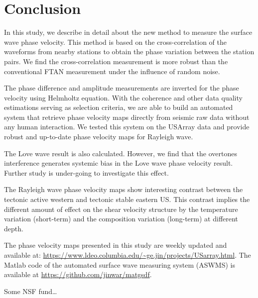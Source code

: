 \documentclass[referee]{gji}
\begin{document}
\section{Conclusion}

In this study, we describe in detail about the new method to measure the surface wave phase velocity. This method is based on the cross-correlation of the waveforms from nearby stations to obtain the phase variation between the station pairs. We find the cross-correlation measurement is more robust than the conventional FTAN measurement under the influence of random noise.

The phase difference and amplitude measurements are inverted for the phase velocity using Helmholtz equation. With the coherence and other data quality estimations serving as selection criteria, we are able to build an automated system that retrieve phase velocity maps directly from seismic raw data without any human interaction. We tested this system on the USArray data and provide robust and up-to-date phase velocity maps for Rayleigh wave.

The Love wave result is also calculated. However, we find that the overtones interference generates systemic bias in the Love wave phase velocity result. Further study is under-going to investigate this effect.

The Rayleigh wave phase velocity maps show interesting contrast between the tectonic active western and tectonic stable eastern US. This contrast implies the different amount of effect on the shear velocity structure by the temperature variation (short-term) and the composition variation (long-term) at different depth.

The phase velocity maps presented in this study are weekly updated and  available at: \url{https://www.ldeo.columbia.edu/~ge.jin/projects/USarray.html}. The Matlab code of the automated surface wave measuring system (ASWMS) is available at \url{https://github.com/jinwar/matgsdf}.


\begin{acknowledgments}
	Some NSF fund\ldots 
\end{acknowledgments}
\end{document}
